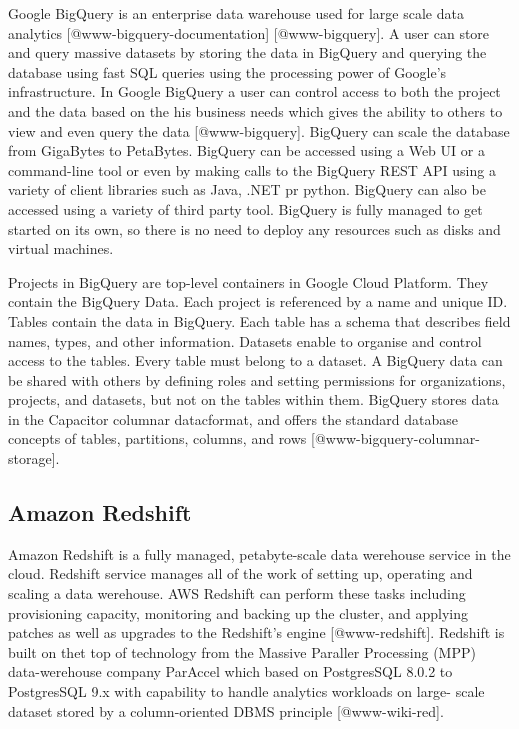 Google BigQuery is an enterprise data warehouse used for large scale
data analytics [@www-bigquery-documentation] [@www-bigquery].
A user can store and query massive datasets by storing the data in
BigQuery and querying the database using fast SQL queries using the
processing power of Google's infrastructure. In Google BigQuery a user
can control access to both the project and the data based on the his
business needs which gives the ability to others to view and even
query the data [@www-bigquery]. BigQuery can scale the database
from GigaBytes to PetaBytes. BigQuery can be accessed using a Web UI
or a command-line tool or even by making calls to the BigQuery REST
API using a variety of client libraries such as Java, .NET pr
python. BigQuery can also be accessed using a variety of third party
tool. BigQuery is fully managed to get started on its own, so there is
no need to deploy any resources such as disks and virtual machines.

Projects in BigQuery are top-level containers in Google Cloud
Platform\cite{www-bigquery-documentation}. They contain the BigQuery
Data. Each project is referenced by a name and unique ID. Tables
contain the data in BigQuery. Each table has a schema that describes
field names, types, and other information. Datasets enable to organise
and control access to the tables. Every table must belong to a
dataset. A BigQuery data can be shared with others by defining roles
and setting permissions for organizations, projects, and datasets, but
not on the tables within them. BigQuery stores data in the Capacitor
columnar datacformat, and offers the standard database concepts of
tables, partitions, columns, and
rows [@www-bigquery-columnar-storage].



     
\subsection{Amazon Redshift}
     
Amazon Redshift is a fully managed, petabyte-scale data werehouse
service in the cloud. Redshift service manages all of the work of
setting up, operating and scaling a data werehouse. AWS Redshift can
perform these tasks including provisioning capacity, monitoring and
backing up the cluster, and applying patches as well as upgrades to
the Redshift's engine [@www-redshift].  Redshift is built on thet
top of technology from the Massive Paraller Processing (MPP)
data-werehouse company ParAccel which based on PostgresSQL 8.0.2 to
PostgresSQL 9.x with capability to handle analytics workloads on
large- scale dataset stored by a column-oriented DBMS
principle [@www-wiki-red].

